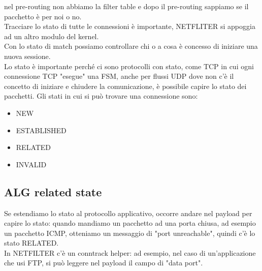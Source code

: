 \documentclass[12pt, oneside]{extbook} %
\begin{document}
nel pre-routing non abbiamo la filter table e dopo il pre-routing sappiamo se il pacchetto è per noi o no.
\\Tracciare lo stato di tutte le connessioni è importante, NETFLITER si appoggia ad un altro modulo del kernel.
\\Con lo stato di match possiamo controllare chi o a cosa è concesso di iniziare una nuova sessione.
\\Lo stato è importante perché ci sono protocolli con stato, come TCP in cui ogni connessione TCP "esegue" una FSM, anche per flussi UDP dove non c'è il concetto di iniziare e chiudere la comunicazione, è possibile capire lo stato dei pacchetti.
Gli stati in cui si può trovare una connessione sono:
\begin{itemize}
    \item NEW
    \item ESTABLISHED
    \item RELATED
    \item INVALID
\end{itemize}

\subsection{ALG related state}
Se estendiamo lo stato al protocollo applicativo, occorre andare nel payload per capire lo stato: quando mandiamo un pacchetto ad una porta chiusa, ad esempio un pacchetto ICMP, otteniamo un messaggio di "port unreachable", quindi c'è lo stato RELATED.
\\In NETFILTER c'è un conntrack helper: ad esempio, nel caso di un'applicazione che usi FTP, si può leggere nel payload il campo di "data port".
\end{document}
